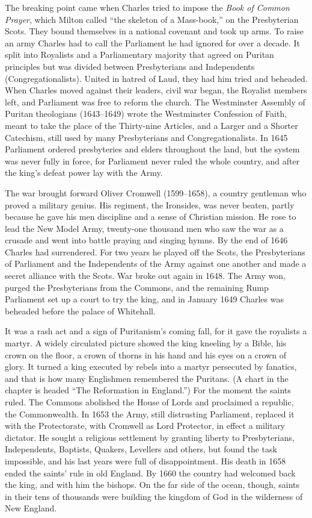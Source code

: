 The breaking point came when Charles tried to impose the \emph{Book of Common Prayer}, which Milton
called ``the skeleton of a Mass-book,'' on the Presbyterian Scots. They bound themselves in a
national covenant and took up arms. To raise an army Charles had to call the Parliament he had
ignored for over a decade. It split into Royalists and a Parliamentary majority that agreed on
Puritan principles but was divided between Presbyterians and Independents (Congregationalists).
United in hatred of Laud, they had him tried and beheaded. When Charles moved against their leaders,
civil war began, the Royalist members left, and Parliament was free to reform the church. The
Westminster Assembly of Puritan theologians (1643--1649) wrote the Westminster Confession of Faith, meant to take the place of the Thirty-nine Articles, and a Larger and a Shorter Catechism, still used by many
Presbyterians and Congregationalists. In 1645 Parliament ordered presbyteries and elders throughout
the land, but the system was never fully in force, for Parliament never ruled the whole country, and
after the king's defeat power lay with the Army.

The war brought forward Oliver Cromwell (1599--1658), a country gentleman who proved a military
genius. His regiment, the Ironsides, was never beaten, partly because he gave his men discipline and
a sense of Christian mission. He rose to lead the New Model Army, twenty-one thousand men who saw the
war as a crusade and went into battle praying and singing hymns. By the end of 1646 Charles had
surrendered. For two years he played off the Scots, the Presbyterians of Parliament and the
Independents of the Army against one another and made a secret alliance with the Scots. War broke out
again in 1648. The Army won, purged the Presbyterians from the Commons, and the remaining Rump
Parliament set up a court to try the king, and in January 1649 Charles was beheaded before the palace of
Whitehall.

It was a rash act and a sign of Puritanism's coming fall, for it gave the royalists a martyr. A
widely circulated picture showed the king kneeling by a Bible, his crown on the floor, a crown of
thorns in his hand and his eyes on a crown of glory. It turned a king executed by rebels into a
martyr persecuted by fanatics, and that is how many Englishmen remembered the Puritans. (A chart in
the chapter is headed ``The Reformation in England.'') For the moment the saints ruled. The Commons
abolished the House of Lords and proclaimed a republic, the Commonwealth. In 1653 the Army, still
distrusting Parliament, replaced it with the Protectorate, with Cromwell as Lord Protector, in effect
a military dictator. He sought a religious settlement by granting liberty to Presbyterians,
Independents, Baptists, Quakers, Levellers and others, but found the task impossible, and his last
years were full of disappointment. His death in 1658 ended the saints' rule in old England. By 1660 the country had welcomed back the king, and with him the bishops. On the far side of the ocean, though, saints in their tens of thousands were building the kingdom of God in the wilderness of
New England.

